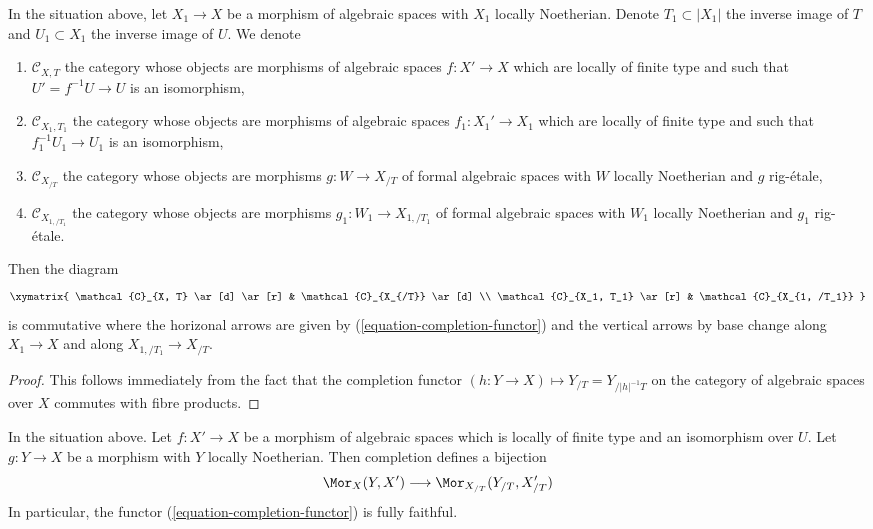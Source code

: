 \begin{lemma}
\label{lemma-functoriality-completion-functor}
In the situation above, let $X_1 \to X$ be a morphism of algebraic
spaces with $X_1$ locally Noetherian. Denote $T_1 \subset |X_1|$
the inverse image of $T$ and $U_1 \subset X_1$ the inverse image of $U$.
We denote
\begin{enumerate}
\item $\mathcal{C}_{X, T}$ the category whose objects are
morphisms of algebraic spaces $f : X' \to X$ which are locally
of finite type and such that $U' = f^{-1}U \to U$ is an isomorphism,
\item $\mathcal{C}_{X_1, T_1}$ the category whose objects are
morphisms of algebraic spaces $f_1 : X_1' \to X_1$ which are locally
of finite type and such that $f_1^{-1}U_1 \to U_1$ is an isomorphism,
\item $\mathcal{C}_{X_{/T}}$ the category whose objects are
morphisms $g : W \to X_{/T}$ of formal algebraic spaces
with $W$ locally Noetherian and $g$ rig-\'etale,
\item $\mathcal{C}_{X_{1, /T_1}}$ the category whose objects are
morphisms $g_1 : W_1 \to X_{1, /T_1}$ of formal algebraic spaces
with $W_1$ locally Noetherian and $g_1$ rig-\'etale.
\end{enumerate}
Then the diagram
$$
\xymatrix{
\mathcal{C}_{X, T} \ar[d] \ar[r] &
\mathcal{C}_{X_{/T}} \ar[d] \\
\mathcal{C}_{X_1, T_1} \ar[r] &
\mathcal{C}_{X_{1, /T_1}}
}
$$
is commutative where the horizonal arrows are given by
(\ref{equation-completion-functor})
and the vertical arrows by base change along
$X_1 \to X$ and along $X_{1, /T_1} \to X_{/T}$.
\end{lemma}

\begin{proof}
This follows immediately from the fact that the completion functor
$(h : Y \to X) \mapsto Y_{/T} = Y_{/|h|^{-1}T}$
on the category of algebraic spaces over $X$
commutes with fibre products.
\end{proof}

\begin{lemma}
\label{lemma-completion-functor-fully-faithful}
In the situation above. Let $f : X' \to X$ be a morphism of algebraic spaces
which is locally of finite type and an isomorphism over $U$. Let
$g : Y \to X$ be a morphism with $Y$ locally Noetherian. Then completion
defines a bijection
$$
\Mor_X(Y, X') \longrightarrow \Mor_{X_{/T}}(Y_{/T}, X'_{/T})
$$
In particular, the functor (\ref{equation-completion-functor}) is
fully faithful.
\end{lemma}

